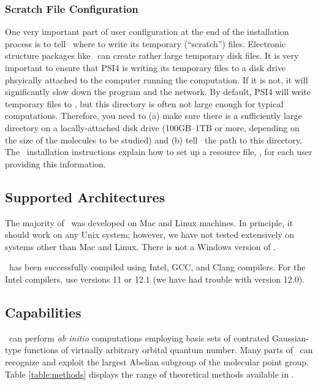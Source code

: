 \subsubsection{Scratch File Configuration}
One very important part of user configuration at the end of the
installation process is to tell \PSIfour\ where to write its temporary
(``scratch'') files.  Electronic structure packages like \PSIfour\ can
create rather large temporary disk files.  It is very important to 
ensure that PSI4 is writing its temporary files to a disk drive
phsyically attached to the computer running the computation.  If it
is not, it will significantly slow down the program and the network.
By default, PSI4 will write temporary files to , but this
directory is often not large enough for typical computations.  Therefore,
you need to (a) make sure there is a sufficiently large directory on a
locally-attached disk drive (100GB--1TB or more, depending on the size of
the molecules to be studied) and (b) tell \PSIfour\ the path to this
directory.  The \PSIfour\ installation instructions explain how to set up a
resource file, \psirc, for each user providing this information.


\subsection{Supported Architectures}
The majority of \PSIfour\ was developed on Mac and Linux machines.  In
principle, it should work on any Unix system; however, we have not tested
extensively on systems other than Mac and Linux.  There is not a Windows
version of \PSIfour.

\PSIfour\ has been successfully compiled using Intel, GCC, and Clang
compilers.  For the Intel compilers, use versions 11 or
12.1 (we have had trouble with version 12.0).  


\subsection{Capabilities}

\PSIfour\ can perform {\em ab initio} computations employing basis
sets of contrated Gaussian-type functions of virtually arbitrary
orbital quantum number.  Many parts of \PSIfour\ can recognize and
exploit the largest Abelian subgroup of the molecular point group.
Table \ref{table:methods} displays the range of theoretical methods
available in \PSIfour.


